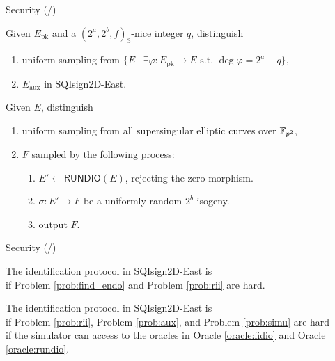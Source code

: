 \begin{frame}{Security (/\securitytotal{})}
    \begin{prob}\label{prob:aux}
        Given $E_\mathrm{pk}$ and a $(2^a, 2^b, f)_3$-nice integer $q$, distinguish
        \begin{enumerate}
            \item uniform sampling from $\{E \mid \exists\varphi: E_\mathrm{pk} \to E \text{ s.t. } \deg\varphi = 2^a - q\}$,
            \item $E_\mathrm{aux}$ in SQIsign2D-East.
        \end{enumerate}
    \end{prob}

    \vspace{5pt}
    \begin{prob}\label{prob:simu}
        Given $E$, distinguish
        \begin{enumerate}
            \item uniform sampling from all supersingular elliptic curves over $\mathbb{F}_{p^2}$,
            \item $F$ sampled by the following process:
            \begin{enumerate}
                \normalsize
                \item $E' \leftarrow \textsf{RUNDIO}(E)$, rejecting the zero morphism.
                \item $\sigma : E' \to F$ be a uniformly random $2^b$-isogeny.
                \item output $F$.
            \end{enumerate}
        \end{enumerate}
    \end{prob}
\end{frame}

\begin{frame}{Security (/\securitytotal{})}
    \begin{theorem}[Soundness]
        The identification protocol in SQIsign2D-East is
        \\
        if Problem \ref{prob:find_endo} and Problem \ref{prob:rii} are hard.
    \end{theorem}

    \vspace{10pt}
    \begin{theorem}
        The identification protocol in SQIsign2D-East is \\
        if Problem \ref{prob:rii}, Problem \ref{prob:aux}, and Problem \ref{prob:simu} are hard\\
        if the simulator can access to the oracles in Oracle \ref{oracle:fidio} and Oracle \ref{oracle:rundio}.
    \end{theorem}
\end{frame}

